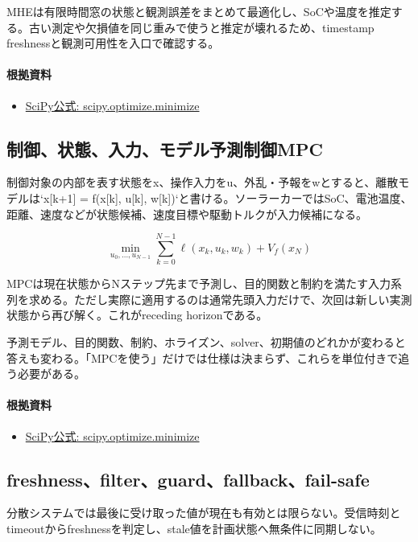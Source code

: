 \documentclass[a4paper,11pt]{article}
\begin{document}
MHEは有限時間窓の状態と観測誤差をまとめて最適化し、SoCや温度を推定する。古い測定や欠損値を同じ重みで使うと推定が壊れるため、timestamp freshnessと観測可用性を入口で確認する。

\paragraph{根拠資料}
\begin{itemize}[leftmargin=1.6em]
\item \href{https://docs.scipy.org/doc/scipy/reference/generated/scipy.optimize.minimize.html}{SciPy公式: scipy.optimize.minimize}
\end{itemize}

\subsection{制御、状態、入力、モデル予測制御MPC}
制御対象の内部を表す状態をx、操作入力をu、外乱・予報をwとすると、離散モデルは`x[k+1] = f(x[k], u[k], w[k])`と書ける。ソーラーカーではSoC、電池温度、距離、速度などが状態候補、速度目標や駆動トルクが入力候補になる。


\[
\min_{u_0,\ldots,u_{N-1}} \sum_{k=0}^{N-1}\ell(x_k,u_k,w_k)+V_f(x_N)
\]

MPCは現在状態からNステップ先まで予測し、目的関数と制約を満たす入力系列を求める。ただし実際に適用するのは通常先頭入力だけで、次回は新しい実測状態から再び解く。これがreceding horizonである。


予測モデル、目的関数、制約、ホライズン、solver、初期値のどれかが変わると答えも変わる。「MPCを使う」だけでは仕様は決まらず、これらを単位付きで追う必要がある。

\paragraph{根拠資料}
\begin{itemize}[leftmargin=1.6em]
\item \href{https://docs.scipy.org/doc/scipy/reference/generated/scipy.optimize.minimize.html}{SciPy公式: scipy.optimize.minimize}
\end{itemize}

\subsection{freshness、filter、guard、fallback、fail-safe}
分散システムでは最後に受け取った値が現在も有効とは限らない。受信時刻とtimeoutからfreshnessを判定し、stale値を計画状態へ無条件に同期しない。
\end{document}
